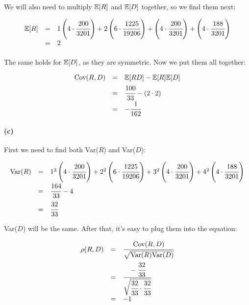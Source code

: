 \documentclass[a4paper]{article}
\begin{document}
We will also need to multiply $\mathbb{E}[R]$ and $\mathbb{E}[D]$ together, so we find them next:

\begin{equation}
\begin{array}{rll}
\mathbb{E}[R] & = & 1\left(4 \cdot \cfrac{200}{3201} \right) + 2\left(6 \cdot \cfrac{1225}{19206} \right) + \left(4 \cdot \cfrac{200}{3201} \right) + \left( 4 \cdot \cfrac{188}{3201} \right) \\[.05in]
& = & 2 \\[.05in]
\end{array}
\end{equation}

The same holds for $\mathbb{E}[D]$, as they are symmetric. Now we put them all together:

\begin{equation}
\begin{array}{rll}
\mbox{Cov}(R, D) & = & \mathbb{E}[RD]-\mathbb{E}[R] \mathbb{E}[D] \\[.05in]
& = & \cfrac{100}{33} - (2 \cdot 2) \\[.05in]
& = & -\cfrac{1}{162} \\[.05in]
\end{array}
\end{equation}


\paragraph{(c)}

First we need to find both Var($R$) and Var($D$):

\begin{equation}
\begin{array}{rll}
\mbox{Var}(R) & = & 1^2 \left(4 \cdot \cfrac{200}{3201} \right) + 2^2 \left(6 \cdot \cfrac{1225}{19206} \right) + 3^2 \left(4 \cdot \cfrac{200}{3201} \right) + 4^2 \left( 4 \cdot \cfrac{188}{3201} \right)  \\[.1in]
& = & \cfrac{164}{33} -4 \\[.1in]
& = & \cfrac{32}{33} \\[.05in]
\end{array}
\end{equation}

Var($D$) will be the same. After that, it's easy to plug them into the equation:

\begin{equation}
\begin{array}{rll}
\rho(R,D) & = & \cfrac{\mbox{Cov}(R,D)}{\sqrt{\mbox{Var}(R)\mbox{Var}(D)}} \\[.15in]
& = & \cfrac{-\cfrac{32}{33}}{\sqrt{\cfrac{32}{33} \cdot \cfrac{32}{33}}} \\[.2in]
& = & -1\\[.1in]
\end{array}
\end{equation}
\end{document}
